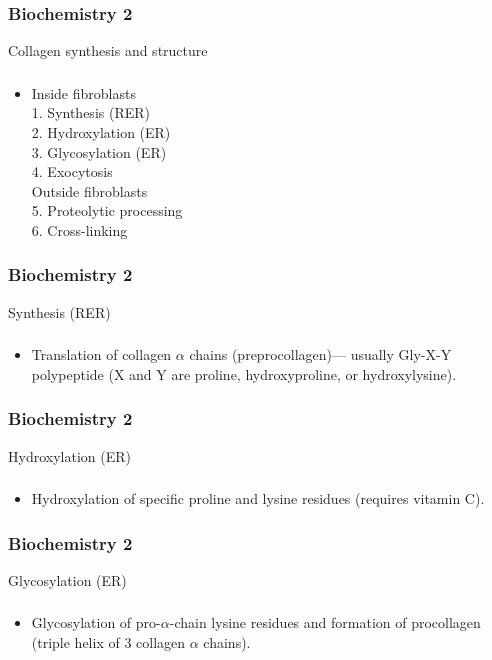 \documentclass[11pt]{beamer}
\begin{document}
\begin{frame}
 \frametitle{Biochemistry 2}
Collagen synthesis and structure
\end{frame}

\begin{frame}
 \frametitle{}
\begin{itemize}
\item Inside fibroblasts \\ 1. Synthesis (RER) \\ 2. Hydroxylation (ER) \\ 3. Glycosylation (ER) \\ 4. Exocytosis \\ Outside fibroblasts \\ 5. Proteolytic processing \\ 6. Cross-linking
\end{itemize}
\end{frame}

\begin{frame}
 \frametitle{Biochemistry 2}
Synthesis (RER)
\end{frame}

\begin{frame}
 \frametitle{}
\begin{itemize}
\item Translation of collagen ${\alpha}$ chains (preprocollagen)— usually Gly-X-Y polypeptide (X and Y are proline, hydroxyproline, or hydroxylysine).
\end{itemize}
\end{frame}

\begin{frame}
 \frametitle{Biochemistry 2}
Hydroxylation (ER)
\end{frame}

\begin{frame}
 \frametitle{}
\begin{itemize}
\item Hydroxylation of specific proline and lysine residues (requires vitamin C).
\end{itemize}
\end{frame}

\begin{frame}
 \frametitle{Biochemistry 2}
Glycosylation (ER)
\end{frame}

\begin{frame}
 \frametitle{}
\begin{itemize}
\item Glycosylation of pro-${\alpha}$-chain lysine residues and formation of procollagen (triple helix of 3 collagen ${\alpha}$ chains).
\end{itemize}
\end{frame}
\end{document}
